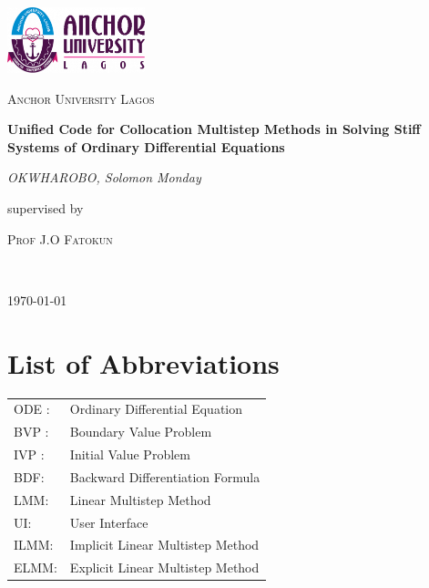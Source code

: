 \documentclass[12pt, a4paper, twoside]{report}
\begin{document}
\begin{titlepage}
   \centering
   \vspace*{1cm}
   \includegraphics[width=0.3\textwidth]{aul_logo.png}\par
   \vspace{1.5cm}
   {\scshape\LARGE Anchor University Lagos \par}
   \vspace{1cm}
   \vspace{1.5cm}
   {\huge\bfseries Unified Code for Collocation Multistep Methods in Solving Stiff Systems of Ordinary Differential Equations\par}
   \vspace{2cm}
   {\Large\itshape OKWHAROBO, Solomon Monday\par}
   \vfill
   supervised by\par
   \textsc{Prof J.O Fatokun}
  
   
    \\
   

   \vfill

   {\large \today\par}
\end{titlepage}

\tableofcontents

\chapter*{List of Abbreviations}
\begin{tabular}{ll}
    ODE : & Ordinary Differential Equation \\
    BVP : & Boundary Value Problem \\
    IVP : & Initial Value Problem \\
    BDF: &Backward Differentiation Formula \\
    LMM: &Linear Multistep Method \\
    UI: &User Interface \\
    ILMM:& Implicit Linear Multistep Method \\
    ELMM: & Explicit Linear Multistep Method
\end{tabular}








 
\end{document}
